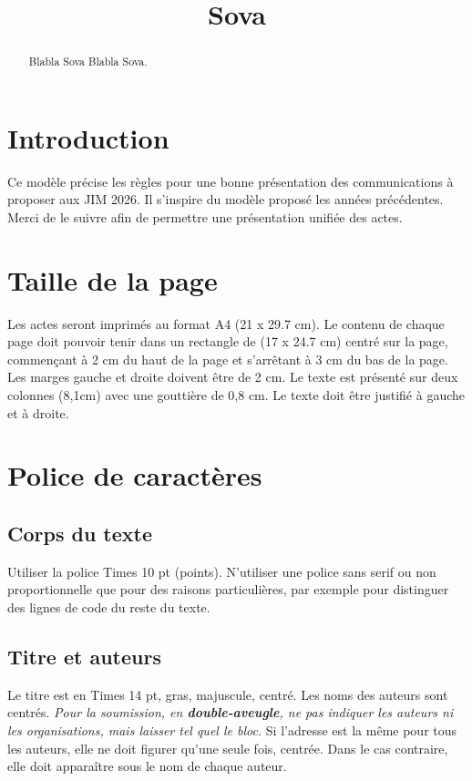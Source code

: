 \documentclass{article}
\title{Sova}
\begin{document}
%
\maketitle
%
\begin{abstract}
  Blabla Sova Blabla Sova.
\end{abstract}
%
\section{Introduction}\label{sec:introduction}

Ce modèle précise les règles pour une bonne présentation des communications à proposer aux JIM 2026. Il s'inspire du modèle proposé les années précédentes.
Merci de le suivre afin de permettre une présentation unifiée des actes. 


\section{Taille de la page}\label{sec:page_size}

Les actes seront imprimés au format A4 (21 x 29.7 cm). Le contenu de chaque page doit pouvoir tenir dans un rectangle de (17 x 24.7 cm) centré sur la page, commençant à 2 cm du haut de la page et s'arrêtant à  3 cm du bas de la page. Les marges gauche et droite doivent être de 2 cm. Le texte est présenté sur deux colonnes (8,1cm) avec une gouttière  de 0,8 cm. Le texte doit être justifié à gauche et à droite.

\section{Police de caractères}\label{sec:typeset_text}

\subsection{Corps du texte}\label{subsec:body}

Utiliser la police Times 10 pt (points). N'utiliser une police sans serif ou non proportionnelle que pour des raisons particulières, par exemple pour distinguer des lignes de code du reste du texte.

\subsection{Titre et auteurs}

Le titre est en Times 14 pt, gras, majuscule, centré. Les noms des auteurs sont centrés. 
\textit{Pour la soumission, en {\bfseries double-aveugle}, ne pas indiquer les auteurs ni les organisations, mais laisser tel quel le bloc.}
Si l'adresse est la même pour tous les auteurs, elle ne doit figurer qu'une seule fois, centrée. Dans le cas contraire, elle doit apparaître sous le nom de chaque auteur.
\end{document}
